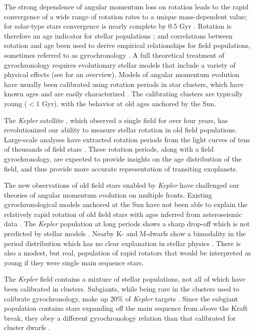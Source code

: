 \documentclass[manuscript]{aastex6}
\newcommand{\Kepler}{\mbox{\textit{Kepler}}}
\begin{document}
The strong dependence of angular momentum loss on rotation \citep{Kawaler88}
leads to the rapid convergence of a wide range of rotation rates to a unique
mass-dependent value; for solar-type stars convergence is nearly complete by
0.5 Gyr \citep{Pinsonneault89}. Rotation is therefore an age indicator for 
stellar populations \citep{Skumanich72}; and correlations between rotation and
age been used to derive empirical relationships for field populations, 
sometimes referred to as gyrochronology \citep{Barnes07, Mamajek08, Meibom09}.  
A full theoretical treatment of gyrochronology requires evolutionary stellar 
models that include a variety of physical effects (see \citet{Gallet13} for an
overview). Models of angular momentum evolution have usually been calibrated 
using rotation periods in star clusters, which have known ages and are easily 
characterized \citep{Krishnamurthi97, Gallet13, Somers17}. The calibrating 
clusters are typically young (\(< 1\) Gyr), with the behavior at old ages anchored by the Sun. 

The \Kepler{} satellite \citep{Borucki10,Koch10}, which observed a single field
for over four years, has revolutionized our ability to measure stellar 
rotation in old field populations. Large-scale analyses have extracted 
rotation periods from the light curves of tens of thousands of field stars
\citep{Nielsen13, Reinhold13, Garcia14, McQuillan14}. These rotation periods, 
along with a field gyrochronology, are expected to provide insights on the age 
distribution of the field, and thus provide more accurate representation of 
transiting exoplanets.

The new observations of old field stars enabled by \Kepler{} have challenged 
our theories of angular momentum evolution on multiple fronts. Existing 
gyrochronological models anchored at the Sun have not been able to explain
the relatively rapid rotation of old field stars with ages inferred from
asteroseismic data \citep{Angus15, VanSaders16}. The \Kepler{} population at 
long periods shows a sharp drop-off which is not predicted by stellar models 
\citep{VanSaders18}.  Nearby K- and M-dwarfs show a bimodality in the period 
distribution which has no clear explanation in stellar physics 
\citep{Davenport18}. There is also a modest, but real, population of rapid 
rotators that would be interpreted as young if they were single main sequence 
stars.

The \Kepler{} field contains a mixture of stellar populations, not all of which
have been calibrated in clusters. Subgiants, while being rare in the clusters used to calibrate gyrochronology, 
make up 20\% of \Kepler{} targets \citep{Gaidos13, Berger18b}. Since the 
subgiant population contains stars expanding off the main sequence from 
above the Kraft break, they obey a different gyrochronology relation than that 
calibrated for cluster dwarfs \citep{vanSaders13}. 
\end{document}
